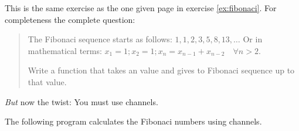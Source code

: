 \begin{Exercise}[title={Fibonaci II},difficulty=7]
\label{ex:fibonaci II}
\Question\label{ex:fibonaci II q1}
This is the same exercise as the one given page \pageref{ex:fibonaci} 
in exercise \ref{ex:fibonaci}. For completeness the complete question:

\begin{quote}
The Fibonaci sequence starts as follows: $1, 1, 2, 3, 5, 8, 13, \ldots$
Or in mathematical terms: $ x_1 = 1; x_2 = 1; x_n = x_{n-1} +
x_{n-2}\quad\forall n > 2 $.

Write a function that takes an  value and gives to
Fibonaci sequence up to that value.
\end{quote}

\begin{lbar}
\emph{But} now the twist: You must use channels.
\end{lbar}


\end{Exercise}

\begin{Answer}
\Question
The following program calculates the Fibonaci numbers using channels.

\end{Answer}


